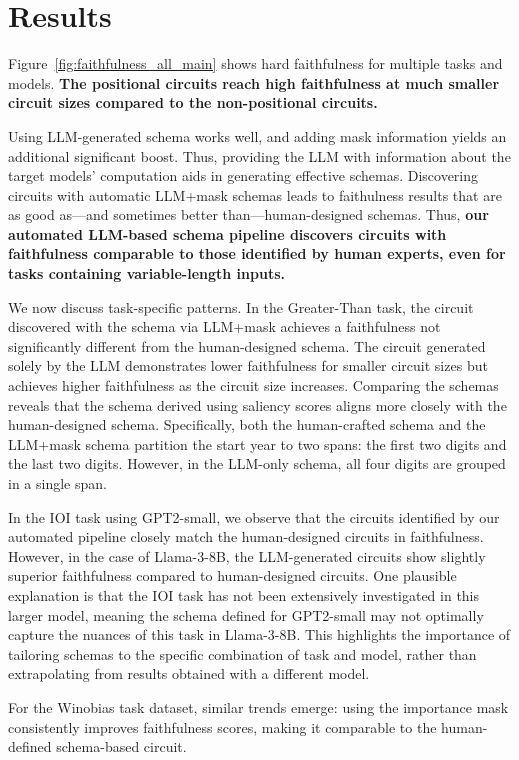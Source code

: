 \section{Results} \label{sec:results}

Figure~\ref{fig:faithfulness_all_main} shows hard faithfulness for multiple tasks and models. 
\textbf{The positional circuits reach high faithfulness at much smaller circuit sizes compared to the non-positional circuits.}

Using LLM-generated schema works well, and adding mask information yields an additional significant boost. Thus, providing the LLM with information about the target models' computation aids in generating effective schemas. 
Discovering circuits with automatic LLM+mask schemas leads to faithulness results that are as good as---and sometimes better than---human-designed schemas. Thus, \textbf{our automated LLM-based schema pipeline discovers circuits with faithfulness comparable to those identified by human experts, even for tasks containing variable-length inputs.}

We now discuss task-specific patterns. In the Greater-Than task, the circuit discovered with the schema via LLM+mask achieves a faithfulness not significantly different from the human-designed schema. The circuit generated solely by the LLM demonstrates lower faithfulness for smaller circuit sizes but achieves higher faithfulness as the circuit size increases. Comparing the  schemas reveals that the schema derived using saliency scores aligns more closely with the human-designed schema. Specifically, both the human-crafted schema and the LLM+mask schema partition the start year to two spans: the first two digits and the last two digits. However, in the LLM-only schema, all four digits are grouped in a single span.

In the IOI task using GPT2-small, we observe that the circuits identified by our automated pipeline closely match the human-designed circuits in faithfulness. However, in the case of Llama-3-8B, the LLM-generated circuits show slightly superior faithfulness compared to human-designed circuits. One plausible explanation is that the IOI task has not been extensively investigated in this larger model, meaning the schema defined for GPT2-small may not optimally capture the nuances of this task in Llama-3-8B. This highlights the importance of tailoring schemas to the specific combination of task and model, rather than extrapolating from results obtained with a different model.

For the Winobias task dataset, similar trends emerge: using the importance mask consistently improves faithfulness scores, making it comparable to the human-defined schema-based circuit.


